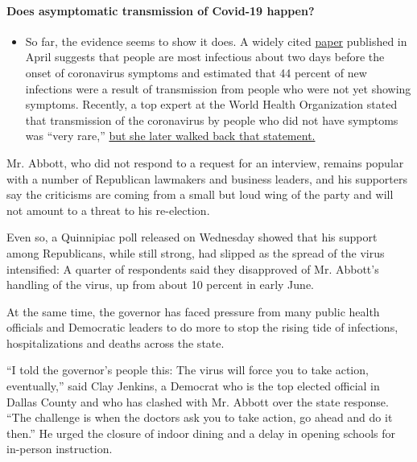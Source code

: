 \begin{itemize}
{  \paragraph{Does asymptomatic transmission of Covid-19
  happen?}\label{does-asymptomatic-transmission-of-covid-19-happen}}

  \begin{itemize}
  \tightlist
  \item
    So far, the evidence seems to show it does. A widely cited
    \href{https://www.nature.com/articles/s41591-020-0869-5}{paper}
    published in April suggests that people are most infectious about
    two days before the onset of coronavirus symptoms and estimated that
    44 percent of new infections were a result of transmission from
    people who were not yet showing symptoms. Recently, a top expert at
    the World Health Organization stated that transmission of the
    coronavirus by people who did not have symptoms was ``very rare,''
    \href{https://www.nytimes.com/2020/06/09/world/coronavirus-updates.html?action=click\&pgtype=Article\&state=default\&region=MAIN_CONTENT_3\&context=storylines_faq\#link-1f302e21}{but
    she later walked back that statement.}
  \end{itemize}
\end{itemize}

Mr. Abbott, who did not respond to a request for an interview, remains
popular with a number of Republican lawmakers and business leaders, and
his supporters say the criticisms are coming from a small but loud wing
of the party and will not amount to a threat to his re-election.

Even so, a Quinnipiac poll released on Wednesday showed that his support
among Republicans, while still strong, had slipped as the spread of the
virus intensified: A quarter of respondents said they disapproved of Mr.
Abbott's handling of the virus, up from about 10 percent in early June.

At the same time, the governor has faced pressure from many public
health officials and Democratic leaders to do more to stop the rising
tide of infections, hospitalizations and deaths across the state.

``I told the governor's people this: The virus will force you to take
action, eventually,'' said Clay Jenkins, a Democrat who is the top
elected official in Dallas County and who has clashed with Mr. Abbott
over the state response. ``The challenge is when the doctors ask you to
take action, go ahead and do it then.'' He urged the closure of indoor
dining and a delay in opening schools for in-person instruction.

